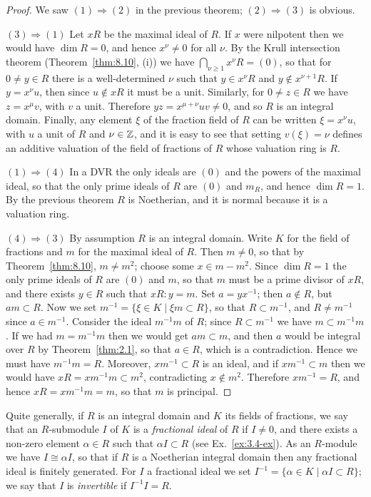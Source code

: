 \begin{proof}
We saw $(1) \Rightarrow (2)$ in the previous theorem; $(2) \Rightarrow (3)$ is obvious.

$(3) \Rightarrow (1)$ Let $xR$ be the maximal ideal of $R$. If $x$ were nilpotent then we
would have $\dim R = 0$, and hence $x^\nu \neq 0$ for all $\nu$. By the Krull intersection
theorem (Theorem~\ref{thm:8.10}, (i)) we have $\bigcap_{\nu \ge 1} x^\nu R = (0)$, so that for $0 \neq y \in R$
there is a well-determined $\nu$ such that $y \in x^\nu R$ and $y \notin x^{\nu+1}R$. If $y = x^\nu u$, then
since $u \notin xR$ it must be a unit. Similarly, for $0 \neq z \in R$ we have $z = x^\mu v$, with $v$ a
unit. Therefore $yz = x^{\mu+\nu}uv \neq 0$, and so $R$ is an integral domain. Finally,
any element $\xi$ of the fraction field of $R$ can be written $\xi = x^\nu u$, with $u$ a unit of
$R$ and $\nu \in \mathbb{Z}$, and it is easy to see that setting $v(\xi) = \nu$ defines an additive
valuation of the field of fractions of $R$ whose valuation ring is $R$.

$(1) \Rightarrow (4)$ In a DVR the only ideals are $(0)$ and the powers of the maximal
ideal, so that the only prime ideals of $R$ are $(0)$ and $m_R$, and hence
$\dim R = 1$. By the previous theorem $R$ is Noetherian, and it is normal
because it is a valuation ring.

$(4) \Rightarrow (3)$ By assumption $R$ is an integral domain. Write $K$ for the field of
fractions and $m$ for the maximal ideal of $R$. Then $m \neq 0$, so that by Theorem~\ref{thm:8.10}, $m \neq m^2$; choose some $x \in m - m^2$. Since $\dim R = 1$ the only prime
ideals of $R$ are $(0)$ and $m$, so that $m$ must be a prime divisor of $xR$, and there
exists $y \in R$ such that $xR:y = m$. Set $a = yx^{-1}$; then $a \notin R$, but $am \subset R$. Now
we set $m^{-1} = \{\xi \in K \mid \xi m \subset R\}$, so that $R \subset m^{-1}$, and $R \neq m^{-1}$ since $a \in m^{-1}$.
Consider the ideal $m^{-1}m$ of $R$; since $R \subset m^{-1}$ we have $m \subset m^{-1}m$. If we
had $m = m^{-1}m$ then we would get $am \subset m$, and then $a$ would be integral
over $R$ by Theorem~\ref{thm:2.1}, so that $a \in R$, which is a contradiction. Hence we
must have $m^{-1}m = R$. Moreover, $xm^{-1} \subset R$ is an ideal, and if $xm^{-1} \subset m$
then we would have $xR = xm^{-1}m \subset m^2$, contradicting $x \notin m^2$. Therefore
$xm^{-1} = R$, and hence $xR = xm^{-1}m = m$, so that $m$ is principal.
\end{proof}

Quite generally, if $R$ is an integral domain and $K$ its fields of fractions, we
say that an $R$-submodule $I$ of $K$ is a \emph{fractional ideal} of $R$ if $I \neq 0$, and
there exists a non-zero element $\alpha \in R$ such that $\alpha I \subset R$ (see Ex.~\ref{ex:3.4-ex}). As
an $R$-module we have $I \cong \alpha I$, so that if $R$ is a Noetherian integral domain
then any fractional ideal is finitely generated. For $I$ a fractional ideal we
set $I^{-1} = \{\alpha \in K \mid \alpha I \subset R\}$; we say that $I$ is \emph{invertible} if $I^{-1}I = R$.

